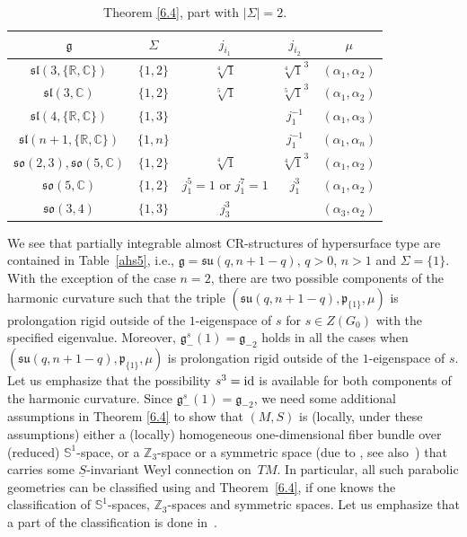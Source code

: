 \documentclass[10pt,a4paper]{amsart}
\newcommand{\Si}{\Sigma}
\newcommand{\un}{\underline}
\newcommand{\fg}{\mathfrak g}
\newcommand{\fp}{\mathfrak p}
\newcommand{\id}{{\rm id}}
\newcommand{\R}{\mathbb{R}}
\newcommand{\C}{\mathbb{C}}
\numberwithin{equation}{section}
\begin{document}
\begin{table}[th!]\centering\caption{Theorem \ref{6.4}, part with $|\Si|=2$.}\label{ahs6}\vspace{1mm}

\begin{tabular}{|c|c|c|c|c|}
\hline
$\fg$ & $\Sigma$ & $j_{i_1}$& $j_{i_2}$& $\mu$ \\
\hline
\hline
$\mathfrak{sl}(3,\{\R,\C\})$ & $\{1,2\}$ & $\sqrt[4]{1}$ & $\sqrt[4]{1}^{3}$& $(\alpha_1,\alpha_2)$ \\
\hline
$\mathfrak{sl}(3,\C)$ & $\{1,2\}$ & $\sqrt[5]{1}$& $\sqrt[5]{1}^{3}$& $(\alpha_1,\alpha_2)$ \\
\hline
$\mathfrak{sl}(4,\{\R,\C\})$ & $\{1,3\}$ & & $j_1^{-1}$& $(\alpha_1,\alpha_3)$ \\
\hline
$\mathfrak{sl}(n+1,\{\R,\C\})$ & $\{1,n\}$ & & $j_1^{-1}$& $(\alpha_1,\alpha_n)$ \\
\hline
$\mathfrak{so}(2,3), \mathfrak{so}(5,\mathbb{C})$ & $\{1,2\}$&$\sqrt[4]{1}$ & $\sqrt[4]{1}^{3}$&$(\alpha_{1},\alpha_2)$\\
\hline
$\mathfrak{so}(5,\mathbb{C})$ & $\{1,2\}$&$j_1^5= 1$ or $j_1^7= 1$&$j_1^3$&$(\alpha_{1},\alpha_2)$\\
\hline
$\mathfrak{so}(3,4)$&$\{ 1,3\}$&$j_3^3$&& $(\alpha_3,\alpha_2)$ \\
\hline
\end{tabular}
\end{table}

\begin{Example}We see that partially integrable almost CR-structures of hypersurface type are contained in Table~\ref{ahs5}, i.e., $\fg=\mathfrak{su}(q,n+1-q)$, $q>0$, $n>1$ and $\Sigma=\{1\}$. With the exception of the case $n=2$, there are two possible components of the harmonic curvature such that the triple $(\mathfrak{su}(q,n+1-q),\fp_{\{1\}},\mu)$ is prolongation rigid outside of the $1$-eigenspace of $s$ for $s\in Z(G_0)$ with the specif\/ied eigenvalue. Moreover, $\fg_-^s(1)=\fg_{-2}$ holds in all the cases when $(\mathfrak{su}(q,n+1-q),\fp_{\{1\}},\mu)$ is prolongation rigid outside of the $1$-eigenspace of $s$. Let us emphasize that the possibility $s^3=\id$ is available for both components of the harmonic curvature. Since $\fg_-^s(1)=\fg_{-2}$, we need some additional assumptions in Theorem \ref{6.4} to show that $(M,S)$ is (locally, under these assumptions) either a (locally) homogeneous one-dimensional f\/iber bundle over (reduced) $\mathbb{S}^1$-space, or a $\mathbb{Z}_3$-space or a symmetric space (due to \cite[Proposition~7.3]{GZ3}, see also~\cite{Loos2}) that carries some $\un S$-invariant Weyl connection on~$TM$. In particular, all such parabolic geometries can be classif\/ied using \cite[Theorem~5.1.4]{disertace} and Theorem~\ref{6.4}, if one knows the classif\/ication of $\mathbb{S}^1$-spaces, $\mathbb{Z}_3$-spaces and symmetric spaces. Let us emphasize that a part of the classif\/ication is done in~\cite{G2}.
\end{Example}
\end{document}
